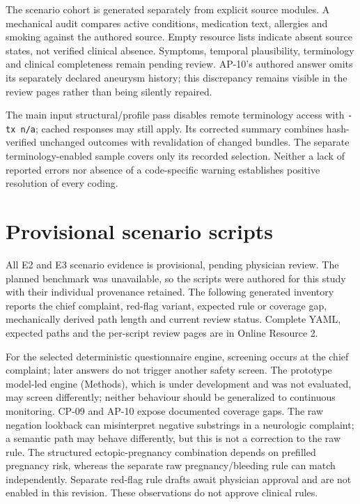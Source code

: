 The scenario cohort is generated separately from explicit source modules. A
mechanical audit compares active conditions, medication text, allergies and smoking
against the authored source. Empty resource lists indicate absent source states,
not verified clinical absence. Symptoms, temporal plausibility, terminology and
clinical completeness remain pending review. AP-10's authored answer omits its
separately declared aneurysm history; this discrepancy remains visible in the
review pages rather than being silently repaired.

The main input structural/profile pass disables remote terminology access with
\texttt{-tx n/a}; cached responses may still apply. Its corrected summary combines
hash-verified unchanged outcomes with revalidation of changed bundles. The separate
terminology-enabled sample covers only its recorded selection. Neither a lack of
reported errors nor absence of a code-specific warning establishes positive
resolution of every coding.

\section{Provisional scenario scripts}\label{sup:s4}
All E2 and E3 scenario evidence is provisional, pending physician review. The
planned benchmark was unavailable, so the scripts were authored for this study
with their individual provenance retained. The following generated inventory
reports the chief complaint, red-flag variant, expected rule or coverage gap,
mechanically derived path length and current review status. Complete YAML,
expected paths and the per-script review pages are in Online Resource 2.


For the selected deterministic questionnaire engine, screening occurs at the chief
complaint; later answers do not trigger another safety screen. The prototype
model-led engine (Methods), which is under development and was not evaluated, may
screen differently; neither behaviour should be generalized to continuous monitoring.
CP-09 and AP-10 expose documented coverage gaps. The raw negation lookback can
misinterpret negative substrings in a neurologic complaint; a semantic path may
behave differently, but this is not a correction to the raw rule. The structured
ectopic-pregnancy combination depends on prefilled pregnancy risk, whereas the
separate raw pregnancy/bleeding rule can match independently. Separate red-flag rule drafts await physician approval and are not enabled in
this revision. These observations do not approve clinical rules.

